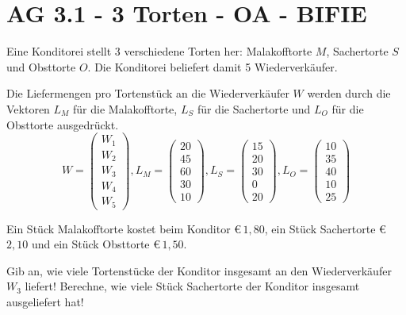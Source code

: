 \section{AG 3.1 - 3 Torten - OA - BIFIE}

\begin{beispiel}[AG 3.1]{1} %
Eine Konditorei stellt 3 verschiedene Torten her: Malakofftorte $M$, Sachertorte $S$ und Obsttorte $O$. Die Konditorei beliefert damit 5 Wiederverkäufer.

Die Liefermengen pro Tortenstück an die Wiederverkäufer $W$ werden durch die Vektoren $L_{M}$ für die Malakofftorte, $L_{S}$ für die Sachertorte und $L_{O}$ für die Obsttorte ausgedrückt.
\[W=\left(\begin{array}{r}W_1\\W_2\\W_3\\W_4\\W_5\end{array}\right), L_{M}=\left(\begin{array}{r}20\\45\\60\\30\\10\end{array}\right), L_{S}=\left(\begin{array}{r}15\\20\\30\\0\\20\end{array}\right), L_{O}=\left(\begin{array}{r}10\\35\\40\\10\\25\end{array}\right)\]

Ein Stück Malakofftorte kostet beim Konditor \euro\,$1,80$, ein Stück Sachertorte \euro\,$2,10$ und ein Stück Obsttorte \euro\,$1,50$.

Gib an, wie viele Tortenstücke der Konditor insgesamt an den Wiederverkäufer $W_{3}$ liefert! Berechne, wie viele Stück Sachertorte der Konditor insgesamt ausgeliefert hat!

\end{beispiel}